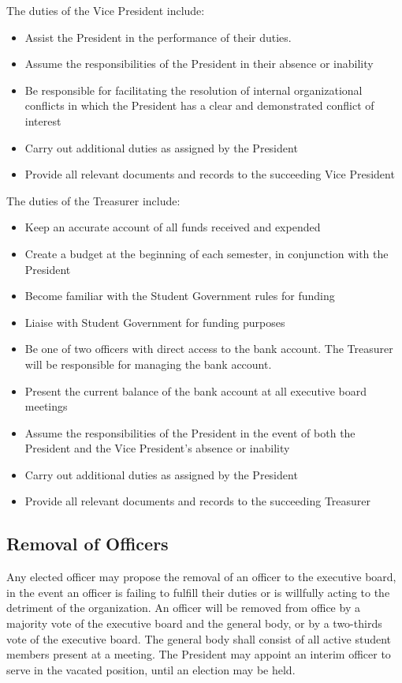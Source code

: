 \documentclass{article}
\begin{document}
\noindent
The duties of the Vice President include:

\begin{itemize}
    \item Assist the President in the performance of their duties. 
	\item Assume the responsibilities of the President in their absence or inability
    \item Be responsible for facilitating the resolution of internal organizational conflicts in which the President has a clear and demonstrated conflict of interest
    \item Carry out additional duties as assigned by the President
    \item Provide all relevant documents and records to the succeeding Vice President
\end{itemize}

\noindent
The duties of the Treasurer include:

\begin{itemize}
    \item Keep an accurate account of all funds received and expended
    \item Create a budget at the beginning of each semester, in conjunction with the President
    \item Become familiar with the Student Government rules for funding
    \item Liaise with Student Government for funding purposes
    \item Be one of two officers with direct access to the bank account. The Treasurer will be responsible for managing the bank account.
    \item Present the current balance of the bank account at all executive board meetings
    \item Assume the responsibilities of the President in the event of both the President and the Vice President’s absence or inability
    \item Carry out additional duties as assigned by the President
    \item Provide all relevant documents and records to the succeeding Treasurer
\end{itemize}


\subsection{Removal of Officers}

Any elected officer may propose the removal of an officer to the executive board, in the event an officer is failing to fulfill their duties or is willfully acting to the detriment of the organization. An officer will be removed from office by a majority vote of the executive board and the general body, or by a two-thirds vote of the executive board. The general body shall consist of all active student members present at a meeting. The President may appoint an interim officer to serve in the vacated position, until an election may be held.
\end{document}
